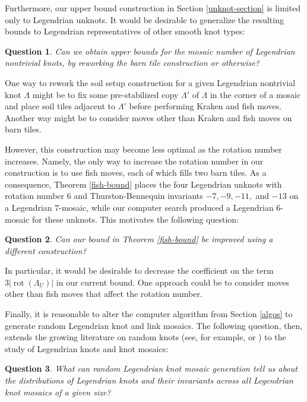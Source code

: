 \documentclass{article}
\DeclareMathOperator{\rot}{rot}
\newtheorem{question}{Question}
\begin{document}
Furthermore, our upper bound construction in Section \ref{unknot-section} is limited only to Legendrian unknots. It would be desirable to generalize the resulting bounds to Legendrian representatives of other smooth knot types:

\begin{question}
    Can we obtain upper bounds for the mosaic number of Legendrian nontrivial knots, by reworking the barn tile construction or otherwise?
\end{question}

One way to rework the soil setup construction for a given Legendrian nontrivial knot $\Lambda$ might be to fix some pre-stabilized copy $\Lambda'$ of $\Lambda$ in the corner of a mosaic and place soil tiles adjacent to $\Lambda'$ before performing Kraken and fish moves.
Another way might be to consider moves other than Kraken and fish moves on barn tiles.

However, this construction may become less optimal as the rotation number increases. Namely, the only way to increase the rotation number in our construction is to use fish moves, each of which fills two barn tiles. As a consequence, Theorem \ref{fish-bound} places the four Legendrian unknots with rotation number 6 and Thurston-Bennequin invariants $-7,-9,-11,$ and $-13$ on a Legendrian 7-mosaic, while our computer search produced a Legendrian 6-mosaic for these unknots. This motivates the following question:

\begin{question}
 Can our bound in Theorem \ref{fish-bound} be improved using a different construction?
\end{question}

In particular, it would be desirable to decrease the coefficient on the term $3|\rot(\Lambda_U)|$ in our current bound. One approach could be to consider moves other than fish moves that affect the rotation number.

Finally, it is reasonable to alter the computer algorithm from Section \ref{algos} to generate random Legendrian knot and link mosaics. The following question, then, extends the growing literature on random knots (see, for example, \cite{random2} or \cite{random3}) to the study of Legendrian knots and knot mosaics:

\begin{question}
    What can random Legendrian knot mosaic generation tell us about the distributions of Legendrian knots and their invariants across all Legendrian knot mosaics of a given size?
\end{question}
\end{document}
